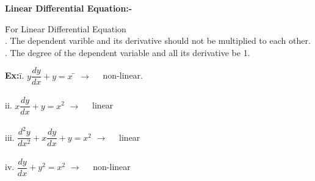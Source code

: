 \documentclass[a4paper, titlepage]{article}
\begin{document}
    \newpage
    \noindent\textbf{Linear Differential Equation:-}
    \begin{tabbing}
        \hspace*{1em}\= For Linear Differential Equation \\
        . The dependent varible and its derivative should not be 
        multiplied to each other. \\
        . The degree of the dependent variable and all its derivative
        be 1.  
    \end{tabbing}
    \begin{tabbing}
        \textbf{Ex:}\hspace{1em}\= i.  $ y\dfrac{dy}{dx} + y = x $ \hspace{4em}\= $ \longrightarrow \hspace{1em} $ non-linear. \\ \\
        \> ii.  $ x\dfrac{dy}{dx} + y = x^2$ \> $ \longrightarrow \hspace{1em} $ linear \\ \\
        \> iii. $ \dfrac{d^2y}{dx^2} + x\dfrac{dy}{dx} + y = x^2 $ \> $ \longrightarrow \hspace{1em} $ linear \\ \\
        \> iv.  $ \dfrac{dy}{dx} + y^2 = x^2 $ \> $ \longrightarrow \hspace{1em} $ non-linear \\ \\
    \end{tabbing}
\end{document}
